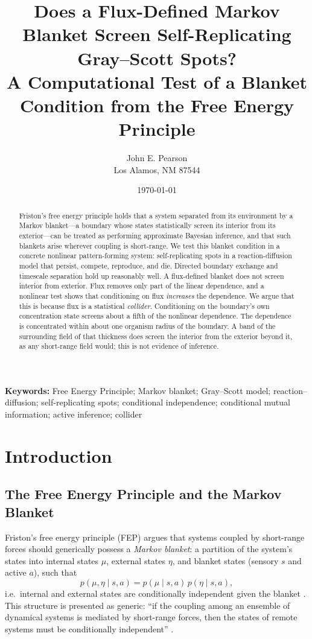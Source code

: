 \documentclass[11pt]{article}
\title{Does a Flux-Defined Markov Blanket Screen Self-Replicating Gray--Scott Spots?\\
\large A Computational Test of a Blanket Condition from the Free Energy Principle}
\author{John E. Pearson\\
Los Alamos, NM 87544}
\date{\today}
\begin{document}
\maketitle

\begin{abstract}
Friston's free energy principle holds that a system separated from its environment by a Markov blanket---a boundary whose states statistically screen its interior from its exterior---can be treated as performing approximate Bayesian inference, and that such blankets arise wherever coupling is short-range. We test this blanket condition in a concrete nonlinear pattern-forming system: self-replicating spots in a reaction-diffusion model that persist, compete, reproduce, and die. Directed boundary exchange and timescale separation hold up reasonably well. A flux-defined blanket does not screen interior from exterior. Flux removes only part of the linear dependence, and a nonlinear test shows that conditioning on flux \emph{increases} the dependence. We argue that this is because flux is a statistical \emph{collider}. Conditioning on the boundary's own concentration state screens about a fifth of the nonlinear dependence. The dependence is concentrated within about one organism radius of the boundary. A band of the surrounding field of that thickness does screen the interior from the exterior beyond it, as any short-range field would; this is not evidence of inference.
\end{abstract}

\noindent\textbf{Keywords:} Free Energy Principle; Markov blanket; Gray--Scott model; reaction--diffusion; self-replicating spots; conditional independence; conditional mutual information; active inference; collider


\section{Introduction}

\subsection{The Free Energy Principle and the Markov Blanket}
\label{sec:fep_intro}

Friston's free energy principle (FEP) argues that systems coupled by short-range forces should generically possess a \emph{Markov blanket}: a partition of the system's states into internal states $\mu$, external states $\eta$, and blanket states (sensory $s$ and active $a$), such that
\begin{equation}
p(\mu, \eta \mid s, a) = p(\mu \mid s, a)\, p(\eta \mid s, a), \label{eq:blanket_condition}
\end{equation}
i.e.\ internal and external states are conditionally independent given the blanket \citep{Friston2006,Friston2010,Friston2013,Friston2019Particular,Friston2023Simpler}. This structure is presented as generic: ``if the coupling among an ensemble of dynamical systems is mediated by short-range forces, then the states of remote systems must be conditionally independent'' \citep{Friston2013}.
\end{document}
